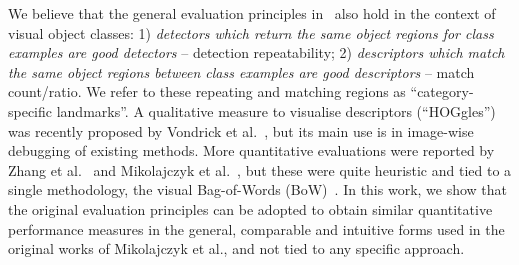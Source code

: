 \documentclass[journal]{IEEEtran}
\begin{document}
We believe that the general evaluation principles in~\cite{MikTuySch:2005,MikSch:2005} also hold in
the context of visual object classes: 1) \textit{detectors which return the same object regions for class
examples are good detectors} -- detection repeatability; 2)
\textit{descriptors which match the same object regions between class examples are good descriptors} -- match count/ratio. We refer to these repeating and matching regions as
``category-specific landmarks''. A qualitative measure to visualise
descriptors (``HOGgles'') was recently proposed by Vondrick et al.~\cite{VonKhoMal:2013},
but its main use is in image-wise debugging of existing methods. More
quantitative evaluations were reported by Zhang et al.~\cite{ZhaMarLaz:2006}
and Mikolajczyk et al.~\cite{MikLeiSch:2005}, but these were quite heuristic
and tied to a single methodology, the visual
Bag-of-Words (BoW)~\cite{SivZis:2003,CsuDanWil:2004}.
In this work, we show that the original evaluation principles can 
be adopted to obtain similar quantitative performance measures in the general,
comparable and intuitive forms used in the original works of Mikolajczyk et al., and not
tied to any specific approach.



%
%
\end{document}
